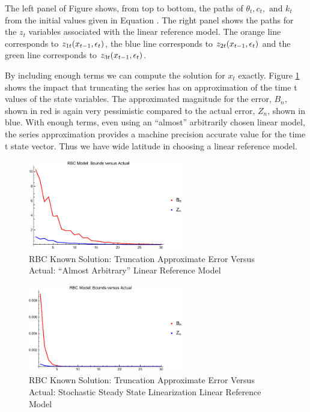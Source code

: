\documentclass[12pt]{article}
\begin{document}
The left panel of Figure  shows, from top to bottom, the paths of $\theta_t, c_t, \text{ and } k_t$ from the initial values given in Equation .  The right panel shows the paths for the $z_t$ variables associated with the linear reference model. The orange line corresponds to $z_{1t}(x_{t-1},\epsilon_t)$,
the blue line corresponds to $z_{2t}(x_{t-1},\epsilon_t)$ and the green line corresponds to $z_{3t}(x_{t-1},\epsilon_t)$.%

By including enough terms we can compute the solution for $x_t$ 
exactly.
Figure \ref{rbcTrunc} shows the impact that truncating the series has 
on approximation of the time t values of the state variables.   The approximated magnitude for the error, $B_n$, shown in red 
 is again very pessimistic compared to the actual error, $Z_n$, shown in blue.
With enough terms, even using an ``almost'' arbitrarily chosen linear model,  the series approximation provides a machine precision accurate value for the time t state vector.  Thus we have wide latitude in choosing a linear reference model.

\begin{figure}
  \centering
\includegraphics[width=2.7in]{simpArbBoundsVActual.pdf}  
  \caption{RBC Known Solution: Truncation Approximate Error  Versus Actual: ``Almost Arbitrary'' Linear Reference Model}
  \label{rbcTrunc}
\end{figure}
\begin{figure}
  \centering
\includegraphics[width=2.7in]{simpBoundsVActual.pdf}  
  \caption{RBC Known Solution: Truncation Approximate Error Versus Actual: Stochastic Steady State Linearization Linear Reference Model}
  \label{rbcTruncSimp}
\end{figure}
\end{document}
